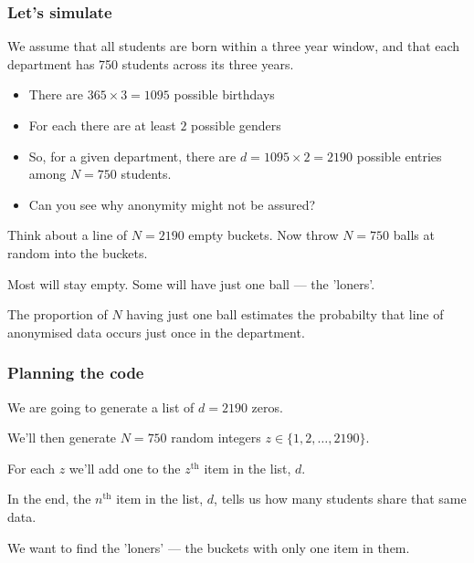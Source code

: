 \documentclass[dvips, %
               xcolor=pst,
               hyperref={colorlinks=false,
               dvips,
               citecolor=magenta,menucolor=cyan,
               bookmarks,bookmarksopen,pdfpagemode=UseThumbs}
              ]{beamer}
\renewcommand{\red}{}
\begin{document}
\begin{frame}[fragile]\frametitle{Let's simulate}

We assume that all students are born within a three year window, and that each
department has 750 students across its three years.

\pause
\begin{itemize}[<+->]

\item There are $365\times 3 = 1095$ possible birthdays

\item For each there are at least $2$ possible genders

\item So, for a given department, there are $d = 1095\times 2 = 2190$
possible entries among $N=750$ students.

\item {\red Can you see why anonymity might not be assured?}

\end{itemize}

\pause\medskip
Think about a line of $N=2190$ empty buckets. Now throw $N=750$ balls at random into
the buckets.

\pause\medskip
Most will stay empty. Some will have just one ball --- the 'loners'.

\pause\medskip
The proportion of $N$ having just one ball estimates the probabilty
that line of anonymised data occurs just once in the department.


\end{frame}

\begin{frame}[fragile]\frametitle{Planning the code}

\pause\medskip
We are going to generate a list of $d = 2190$ zeros.

\pause\medskip
We'll then generate $N=750$ random integers $z\in\{1,2,\ldots,2190\}$.

\pause\medskip
For each $z$ we'll add one to the $z^{\mathrm{th}}$ item in the list,
$d$.

\pause\medskip
In the end, the $n^{\mathrm{th}}$ item in the list, $d$, tells us
how many students share that same data.

\pause\medskip
We want to find the 'loners' --- the buckets with only one item in them.

\end{frame}
\end{document}

